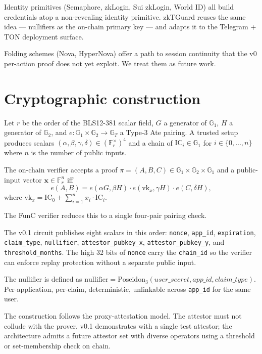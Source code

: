 \documentclass[11pt,a4paper]{article}
\begin{document}
Identity primitives (Semaphore, zkLogin, Sui zkLogin, World ID) all
build credentials atop a non-revealing identity primitive. zkTGuard
reuses the same idea --- nullifiers as the on-chain primary key ---
and adapts it to the Telegram + TON deployment surface.

Folding schemes (Nova, HyperNova) offer a path to session continuity
that the v0 per-action proof does not yet exploit. We treat them as
future work.

\section{Cryptographic construction}\label{sec:construction}

Let $r$ be the order of the BLS12-381 scalar field, $G$ a generator
of $\mathbb{G}_1$, $H$ a generator of $\mathbb{G}_2$, and $e:
\mathbb{G}_1 \times \mathbb{G}_2 \to \mathbb{G}_T$ a Type-3 Ate pairing.
A trusted setup produces scalars $(\alpha, \beta, \gamma, \delta) \in
(\mathbb{F}_r^\times)^4$ and a chain of $\mathrm{IC}_i \in \mathbb{G}_1$
for $i \in \{0, \dots, n\}$ where $n$ is the number of public inputs.

The on-chain verifier accepts a proof $\pi = (A, B, C) \in
\mathbb{G}_1 \times \mathbb{G}_2 \times \mathbb{G}_1$ and a public-input
vector $\mathbf{x} \in \mathbb{F}_r^n$ iff
$$
e(A, B) = e(\alpha G, \beta H) \cdot e(\mathrm{vk}_x, \gamma H) \cdot e(C, \delta H),
$$
where $\mathrm{vk}_x = \mathrm{IC}_0 + \sum_{i=1}^{n} x_i \cdot \mathrm{IC}_i$.

The FunC verifier reduces this to a single four-pair pairing check.

The v0.1 circuit publishes eight scalars in this order: \texttt{nonce},
\texttt{app\_id}, \texttt{expiration}, \texttt{claim\_type},
\texttt{nullifier}, \texttt{attestor\_pubkey\_x},
\texttt{attestor\_pubkey\_y}, and \texttt{threshold\_months}. The
high 32 bits of \texttt{nonce} carry the \texttt{chain\_id} so the
verifier can enforce replay protection without a separate public
input.

The nullifier is defined as $\mathrm{nullifier} = \mathrm{Poseidon}_3(
\mathit{user\_secret}, \mathit{app\_id}, \mathit{claim\_type})$.
Per-application, per-claim, deterministic, unlinkable across
\texttt{app\_id} for the same user.

The construction follows the proxy-attestation model. The attestor
must not collude with the prover. v0.1 demonstrates with a single
test attestor; the architecture admits a future attestor set with
diverse operators using a threshold or set-membership check on chain.
\end{document}
